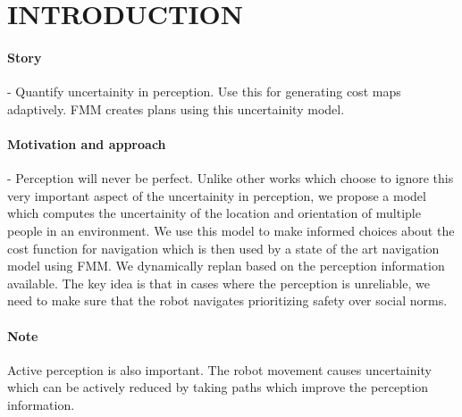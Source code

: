 \section{INTRODUCTION}
\paragraph{Story}  - Quantify uncertainity in perception. Use this for generating cost maps adaptively. FMM creates plans using this uncertainity model.

\paragraph{Motivation and approach} - Perception will never be perfect. Unlike other works which choose to ignore this very important aspect of the uncertainity in perception, we propose a model which computes the uncertainity of the location and orientation of multiple people in an environment. We use this model to make informed choices about the cost function for navigation which is then used by a state of the art navigation model using FMM. We dynamically replan based on the perception information available. The key idea is that in cases where the perception is unreliable, we need to make sure that the robot navigates prioritizing safety over social norms.
\paragraph{Note} Active perception is also important. The robot movement causes uncertainity which can be actively reduced by taking paths which improve the perception information.
